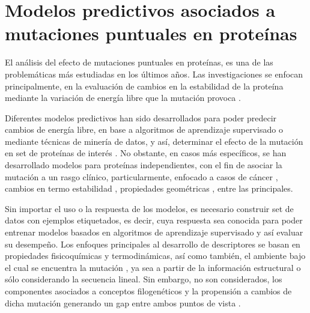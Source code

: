 
\chapter{Modelos predictivos asociados a mutaciones puntuales en proteínas}

\ifpdf
    \graphicspath{{Chapter2/Figs/Raster/}{Chapter2/Figs/PDF/}{Chapter2/Figs/}}
\else
    \graphicspath{{Chapter2/Figs/Vector/}{Chapter2/Figs/}}
\fi

El análisis del efecto de mutaciones puntuales en proteínas, es una de las problemáticas más estudiadas en los últimos años. Las investigaciones se enfocan principalmente, en la evaluación de cambios en la estabilidad de la proteína mediante la variación de energía libre que la mutación provoca \cite{Schymkowitz2005,Pandurangan2017,rohl2004protein,Parthiban2006}. 

Diferentes modelos predictivos han sido desarrollados para poder predecir cambios de energía libre, en base a algoritmos de aprendizaje supervisado o mediante técnicas de minería de datos, y así, determinar el efecto de la mutación en set de proteínas de interés \cite{Quan2016,Capriotti2008,Broom2017,Khan2010,vaisman,Getov2016,Capriotti2005}. No obstante, en casos más específicos, se han desarrollado modelos para proteínas independientes, con el fin de asociar la mutación a un rasgo clínico, particularmente, enfocado a casos de cáncer \cite{article, Forbes2010}, cambios en termo estabilidad \cite{Tian2010}, propiedades geométricas \cite{Barenboim2008}, entre las principales.

Sin importar el uso o la respuesta de los modelos, es necesario construir set de datos con ejemplos etiquetados, es decir, cuya respuesta sea conocida para poder entrenar modelos basados en algoritmos de aprendizaje supervisado y así evaluar su desempeño. Los enfoques principales al desarrollo de descriptores se basan en propiedades fisicoquímicas y termodinámicas, así como también, el ambiente bajo el cual se encuentra la mutación \cite{Capriotti2005}, ya sea a partir de la información estructural o sólo considerando la secuencia lineal. Sin embargo, no son considerados, los componentes asociados a conceptos filogenéticos y la propensión a cambios de dicha mutación generando un gap entre ambos puntos de vista \cite{Olivera-Nappa2011}.

